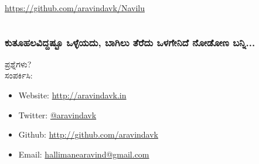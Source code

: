 \documentclass[16pt]{beamer}
\newcommand\en[1]{{\english #1}}
\begin{document}
\begin{spacing}{1.6}
\begin{frame}
\begin{columns}[t]
      \normalsize \url{https://github.com/aravindavk/Navilu}
    \end{columns}
  \end{frame}
  \begin{frame}
    \frametitle{ಕುತೂಹಲವಿದ್ದಷ್ಟೂ ಒಳ್ಳೆಯದು, ಬಾಗಿಲು ತೆರೆದು ಒಳಗೇನಿದೆ ನೋಡೋಣ ಬನ್ನಿ...}
    \LARGE
    ಪ್ರಶ್ನೆಗಳು? \\
    \vspace{0.6in}
    ಸಂಪರ್ಕಿಸಿ:
    \footnotesize
    \begin{spacing}{1.2}
    \begin{itemize}
    \item \en{Website: } \url{http://aravindavk.in}
    \item \en{Twitter: } \href{http://twitter.com/aravindavk}{\en{@aravindavk}}
    \item \en{Github: } \url{http://github.com/aravindavk}
    \item \en{Email: }\href{mailto:hallimanearavind@gmail.com}{\en{hallimanearavind@gmail.com}}
    \end{itemize}
    \end{spacing}
   

  \end{frame}
  \end{spacing}
\end{document}
